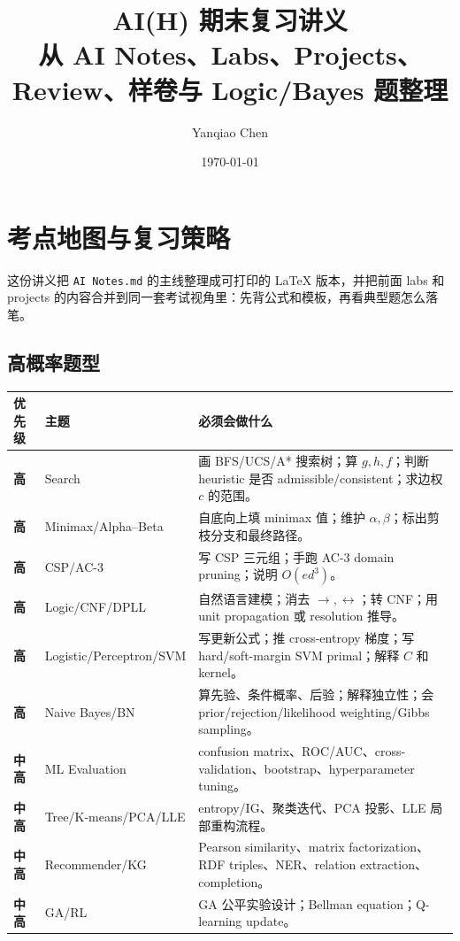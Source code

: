 \documentclass[UTF8,11pt,a4paper]{ctexart}
\title{\textbf{AI(H) 期末复习讲义}\\
\large 从 AI Notes、Labs、Projects、Review、样卷与 Logic/Bayes 题整理}
\author{Yanqiao Chen}
\date{\today}
\begin{document}
\maketitle
\tableofcontents
\newpage

\section{考点地图与复习策略}

这份讲义把 \texttt{AI Notes.md} 的主线整理成可打印的 LaTeX 版本，并把前面 labs 和 projects 的内容合并到同一套考试视角里：先背公式和模板，再看典型题怎么落笔。

\subsection{高概率题型}

\begin{longtable}{>{\bfseries}p{}p{}p{}}
\toprule
优先级 & 主题 & 必须会做什么 \\
\midrule
高 & Search & 画 BFS/UCS/A* 搜索树；算 $g,h,f$；判断 heuristic 是否 admissible/consistent；求边权 $c$ 的范围。\\
高 & Minimax/Alpha--Beta & 自底向上填 minimax 值；维护 $\alpha,\beta$；标出剪枝分支和最终路径。\\
高 & CSP/AC-3 & 写 CSP 三元组；手跑 AC-3 domain pruning；说明 $O(ed^3)$。\\
高 & Logic/CNF/DPLL & 自然语言建模；消去 $\to,\leftrightarrow$；转 CNF；用 unit propagation 或 resolution 推导。\\
高 & Logistic/Perceptron/SVM & 写更新公式；推 cross-entropy 梯度；写 hard/soft-margin SVM primal；解释 $C$ 和 kernel。\\
高 & Naive Bayes/BN & 算先验、条件概率、后验；解释独立性；会 prior/rejection/likelihood weighting/Gibbs sampling。\\
中高 & ML Evaluation & confusion matrix、ROC/AUC、cross-validation、bootstrap、hyperparameter tuning。\\
中高 & Tree/K-means/PCA/LLE & entropy/IG、聚类迭代、PCA 投影、LLE 局部重构流程。\\
中高 & Recommender/KG & Pearson similarity、matrix factorization、RDF triples、NER、relation extraction、completion。\\
中高 & GA/RL & GA 公平实验设计；Bellman equation；Q-learning update。\\
\bottomrule
\end{longtable}
\end{document}
